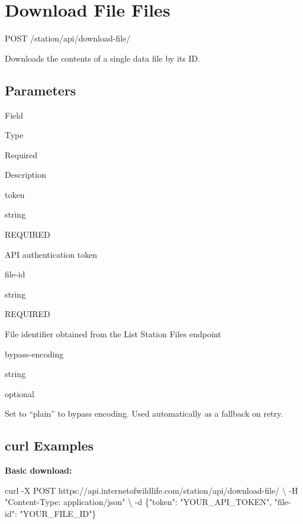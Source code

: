 \documentclass[
]{book}
\newenvironment{Shaded}{\begin{snugshade}}{\end{snugshade}}
\newcommand{\AttributeTok}[1]{\textcolor[rgb]{0.13,0.29,0.53}{#1}}
\newcommand{\DataTypeTok}[1]{\textcolor[rgb]{0.13,0.29,0.53}{#1}}
\newcommand{\ExtensionTok}[1]{#1}
\newcommand{\NormalTok}[1]{#1}
\newcommand{\StringTok}[1]{\textcolor[rgb]{0.31,0.60,0.02}{#1}}
\begin{document}
\section{\texorpdfstring{Download File {Files}}{Download File Files}}\label{download-file-files}

{POST}
{/station/api/download-file/}

Downloads the contents of a single data file by its ID.

\subsection{Parameters}\label{parameters-3}

Field

Type

Required

Description

token

{string}

{REQUIRED}

API authentication token

file-id

{string}

{REQUIRED}

File identifier obtained from the List Station Files endpoint

bypass-encoding

{string}

{optional}

Set to ``plain'' to bypass encoding. Used automatically as a fallback on retry.

\subsection{curl Examples}\label{curl-examples-1}

\textbf{Basic download:}

\begin{Shaded}
\begin{Highlighting}[]
\ExtensionTok{curl} \AttributeTok{{-}X}\NormalTok{ POST https://api.internetofwildlife.com/station/api/download{-}file/ }\DataTypeTok{\textbackslash{}}
  \AttributeTok{{-}H} \StringTok{"Content{-}Type: application/json"} \DataTypeTok{\textbackslash{}}
  \AttributeTok{{-}d} \StringTok{\textquotesingle{}\{"token": "YOUR\_API\_TOKEN", "file{-}id": "YOUR\_FILE\_ID"\}\textquotesingle{}}
\end{Highlighting}
\end{Shaded}
\end{document}
